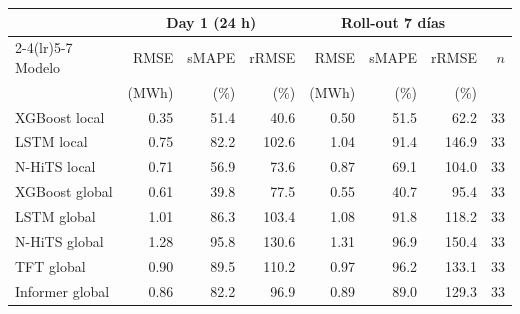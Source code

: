 \begin{tabular}{lrrrrrrr}
\toprule
 & \multicolumn{3}{c}{Day 1 (24 h)} & \multicolumn{3}{c}{Roll-out 7 días} & \\
\cmidrule(lr){2-4}\cmidrule(lr){5-7}
Modelo & RMSE & sMAPE & rRMSE & RMSE & sMAPE & rRMSE & $n$ \\
 & (MWh) & (\%) & (\%) & (MWh) & (\%) & (\%) & \\
\midrule
XGBoost local & 0.35 & 51.4 & 40.6 & 0.50 & 51.5 & 62.2 & 33 \\
LSTM local & 0.75 & 82.2 & 102.6 & 1.04 & 91.4 & 146.9 & 33 \\
N-HiTS local & 0.71 & 56.9 & 73.6 & 0.87 & 69.1 & 104.0 & 33 \\
XGBoost global & 0.61 & 39.8 & 77.5 & 0.55 & 40.7 & 95.4 & 33 \\
LSTM global & 1.01 & 86.3 & 103.4 & 1.08 & 91.8 & 118.2 & 33 \\
N-HiTS global & 1.28 & 95.8 & 130.6 & 1.31 & 96.9 & 150.4 & 33 \\
TFT global & 0.90 & 89.5 & 110.2 & 0.97 & 96.2 & 133.1 & 33 \\
Informer global & 0.86 & 82.2 & 96.9 & 0.89 & 89.0 & 129.3 & 33 \\
\bottomrule
\end{tabular}